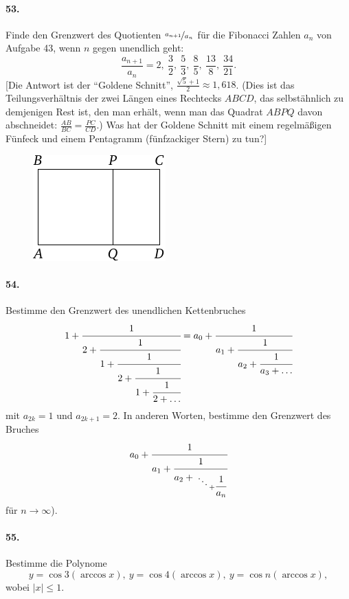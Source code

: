 \documentclass[10pt,a5paper,twoside]{article}
\newenvironment{problem}[1]{\paragraph*{#1}}{}
\begin{document}
\begin{problem}{53.}
	Finde den Grenzwert des Quotienten $\nicefrac{a_{n+1}}{a_n}$ für die Fibonacci Zahlen $a_n$ von Aufgabe 43, wenn $n$ gegen unendlich geht:
	\begin{equation*}
	\frac{a_{n+1}}{a_n}=2,\ \frac 32,\ \frac53, \ \frac85, \ \frac{13}8,
	\ \frac{34}{21}.
	\end{equation*}
	[Die Antwort ist der \enquote{Goldene Schnitt},
	$\frac{\sqrt{5}+1}{2} \approx 1{,}618$. (Dies ist das Tei\-lungs\-ver\-hält\-nis der zwei Längen eines Rechtecks $ABCD$, das selbstähnlich zu demjenigen Rest ist, den man erhält, wenn man das Quadrat $ABPQ$ davon abschneidet: 
	$\frac{AB}{BC}=\frac{PC}{CD}$.) Was hat der Goldene Schnitt mit einem regelmäßigen Fünfeck und einem Pentagramm (fünfzackiger Stern) zu tun?]
	\begin{figure}[H]
	\centering
	\includegraphics{taskbook-37}
	\end{figure}
\end{problem}

\begin{problem}{54.}
	Bestimme den Grenzwert des unendlichen Kettenbruches
	\begin{equation*}
	1+\cfrac{1}{2+\cfrac{1}{1+\cfrac{1}{2+\cfrac{1}{1+\cfrac{1}{2+\ldots}}}}}=
	a_0+\cfrac{1}{a_1+\cfrac{1}{a_2+\cfrac{1}{a_3+\dots}}}
	\end{equation*}
	mit $a_{2k}=1$ und $a_{2k+1}=2$. In anderen Worten, bestimme den Grenzwert des Bruches
	\begin{equation*}
	a_0+\cfrac{1}{a_1+\cfrac{1}{a_2+{\atop{\ddots \atop {}} + \cfrac{1}{a_n}}}}
	\end{equation*}
	für $n \to \infty$).
\end{problem}

\begin{problem}{55.}
	Bestimme die Polynome 
	\begin{equation*}
	y=\cos 3 (\arccos x),\ y=\cos 4 (\arccos x),\ 
	y=\cos n (\arccos x),
	\end{equation*}
	wobei $|x| \leqslant 1$.
\end{problem}
\end{document}
